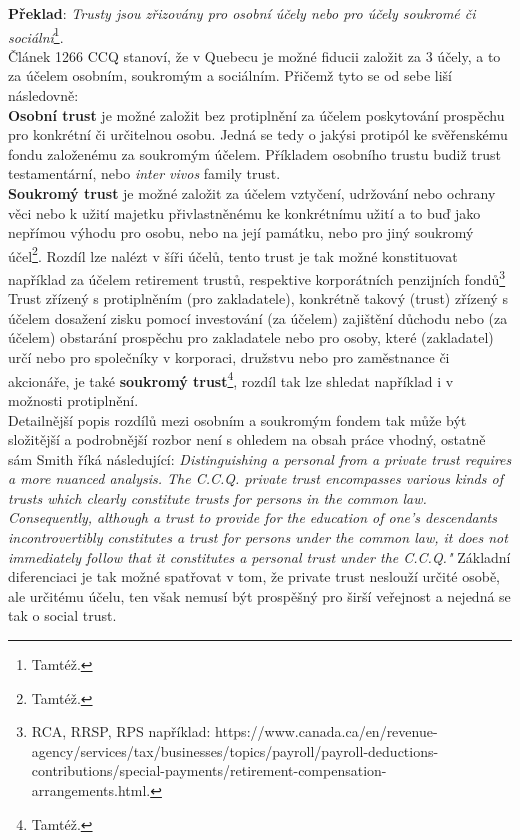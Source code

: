\documentclass{article}
\begin{document}
\textbf{Překlad}: \textit{Trusty jsou zřizovány pro osobní účely nebo pro účely soukromé či sociální}\footnote{Tamtéž.}.\\

Článek 1266 CCQ stanoví, že v Quebecu je možné fiducii založit za 3 účely, a to za účelem osobním, soukromým a sociálním. Přičemž tyto se od sebe liší následovně:\\

\textbf{Osobní trust} je možné založit bez protiplnění za účelem poskytování prospěchu pro konkrétní či určitelnou osobu. Jedná se tedy o jakýsi protipól ke svěřenskému fondu založenému za soukromým účelem. Příkladem osobního trustu budiž trust testamentární, nebo \textit{inter vivos} family trust.\\

\textbf{Soukromý trust} je možné založit za účelem vztyčení, udržování nebo ochrany věci nebo k užití majetku přivlastněnému ke konkrétnímu užití a to buď jako nepřímou výhodu pro osobu, nebo na její památku, nebo pro jiný soukromý účel\footnote{Tamtéž.}. Rozdíl lze nalézt v šíři účelů, tento trust je tak možné konstituovat například za účelem retirement trustů, respektive korporátních penzijních fondů\footnote{RCA, RRSP, RPS například: https://www.canada.ca/en/revenue-agency/services/tax/businesses/topics/payroll/payroll-deductions-contributions/special-payments/retirement-compensation-arrangements.html.}\\

Trust zřízený s protiplněním (pro zakladatele), konkrétně takový (trust) zřízený s účelem dosažení zisku pomocí investování (za účelem) zajištění důchodu nebo (za účelem) obstarání prospěchu pro zakladatele nebo pro osoby, které (zakladatel) určí nebo pro společníky v korporaci, družstvu nebo pro zaměstnance či akcionáře, je také \textbf{soukromý trust}\footnote{Tamtéž.}, rozdíl tak lze shledat například i v možnosti protiplnění.\\

Detailnější popis rozdílů mezi osobním a soukromým fondem tak může být složitější a podrobnější rozbor není s ohledem na obsah práce vhodný, ostatně sám Smith říká následující: \textit{Distinguishing a personal from a private trust requires a more nuanced analysis. The C.C.Q. private trust encompasses various kinds of trusts which clearly constitute trusts for persons in the common law. Consequently, although  a trust to provide for the education of one's descendants incontrovertibly constitutes a trust for persons under the common law, it does not immediately follow that it constitutes a personal trust under the C.C.Q."} Základní diferenciaci je tak možné spatřovat v tom, že private trust neslouží určité osobě, ale určitému účelu, ten však nemusí být prospěšný pro širší veřejnost a nejedná se tak o social trust.\\
\end{document}
